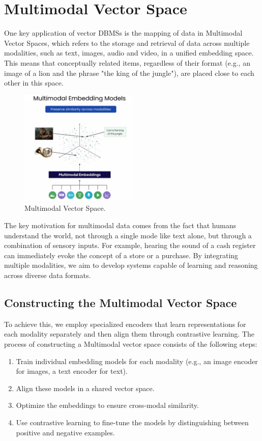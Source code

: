 \section{Multimodal Vector Space}
One key application of vector DBMSs is the mapping of data in Multimodal Vector Spaces, which refers to the storage and retrieval of data across multiple modalities, such as text, images, audio and video, in a unified embedding space. This means that conceptually related items, regardless of their format (e.g., an image of a lion and the phrase "the king of the jungle"), are placed close to each other in this space.
\begin{figure}[h]
    \centering
    \includegraphics[width=0.5\textwidth]{IMAGES/immagine_2025-02-23_214815401.png}
    \caption{Multimodal Vector Space.}
    \label{fig:multimodal_space}
\end{figure}

The key motivation for multimodal data comes from the fact that humans understand the world, not through a single mode like text alone, but through a combination of sensory inputs. For example, hearing the sound of a cash register can immediately evoke the concept of a store or a purchase. By integrating multiple modalities, we aim to develop systems capable of learning and reasoning across diverse data formats. 
\subsection{Constructing the Multimodal Vector Space}
To achieve this, we employ specialized encoders that learn representations for each modality separately and then align them through contrastive learning.
The process of constructing a Multimodal vector space consists of the following steps:
\begin{enumerate}
    \item Train individual embedding models for each modality (e.g., an image encoder for images, a text encoder for text).
    \item Align these models in a shared vector space.
    \item Optimize the embeddings to ensure cross-modal similarity.
    \item Use contrastive learning to fine-tune the models by distinguishing between positive and negative examples.
\end{enumerate}
